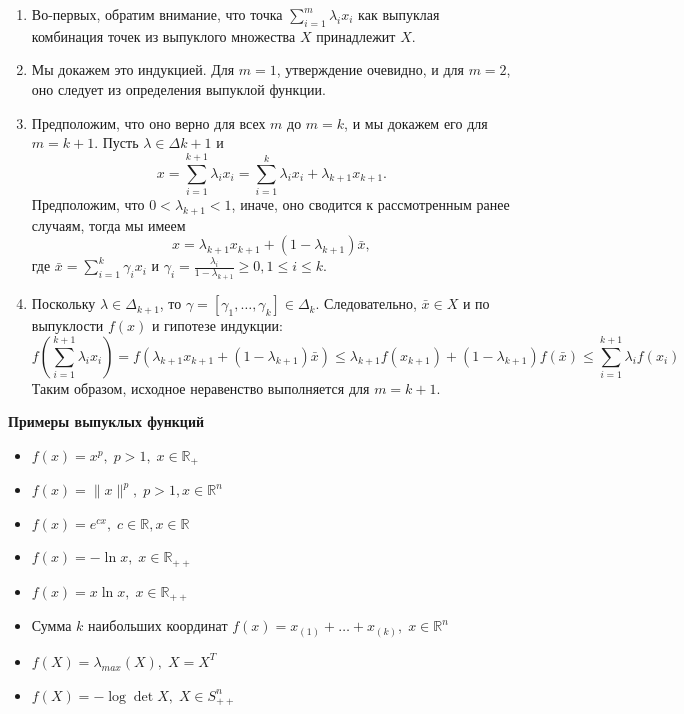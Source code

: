 \documentclass[
  russian,
  letterpaper,
  DIV=11,
  numbers=noendperiod]{scrartcl}
\providecommand{\tightlist}{%
  \setlength{\itemsep}{0pt}\setlength{\parskip}{0pt}}
\begin{document}
\begin{enumerate}
\def\labelenumi{\arabic{enumi}.}
\item
  Во-первых, обратим внимание, что точка
  \(\sum_{i=1}^{m} \lambda_i x_i\) как выпуклая комбинация точек из
  выпуклого множества \(X\) принадлежит \(X\).
\item
  Мы докажем это индукцией. Для \(m = 1\), утверждение очевидно, и для
  \(m = 2\), оно следует из определения выпуклой функции.
\item
  Предположим, что оно верно для всех \(m\) до \(m = k\), и мы докажем
  его для \(m = k + 1\). Пусть \(\lambda \in \Delta{k+1}\) и \[
  x = \sum_{i=1}^{k+1} \lambda_i x_i = \sum_{i=1}^{k} \lambda_i x_i + \lambda_{k+1} x_{k+1}.
  \] Предположим, что \(0 < \lambda_{k+1} < 1\), иначе, оно сводится к
  рассмотренным ранее случаям, тогда мы имеем \[
  x = \lambda_{k+1} x_{k+1} + (1 - \lambda_{k+1}) \bar{x}, 
  \] где \(\bar{x} = \sum_{i=1}^{k} \gamma_i x_i\) и
  \(\gamma_i = \frac{\lambda_i}{1-\lambda_{k+1}} \geq 0, 1 \leq i \leq k\).
\item
  Поскольку \(\lambda \in \Delta_{k+1}\), то
  \(\gamma = [\gamma_1, \ldots, \gamma_k] \in \Delta_k\). Следовательно,
  \(\bar{x} \in X\) и по выпуклости \(f(x)\) и гипотезе индукции: \[
  f\left( \sum_{i=1}^{k+1} \lambda_i x_i \right) = f\left( \lambda_{k+1} x_{k+1} + (1 - \lambda_{k+1})\bar{x} \right) \leq
  \lambda_{k+1}f(x_{k+1}) + (1 - \lambda_{k+1})f(\bar{x}) \leq \sum_{i=1}^{k+1} \lambda_i f(x_i)
  \] Таким образом, исходное неравенство выполняется для \(m = k + 1\).
\end{enumerate}

\textbf{Примеры выпуклых функций}

\begin{itemize}
\tightlist
\item
  \(f(x) = x^p, \;  p > 1,\;  x \in \mathbb{R}_+\)
\item
  \(f(x) = \|x\|^p,\;  p > 1, x \in \mathbb{R}^n\)
\item
  \(f(x) = e^{cx},\;  c \in \mathbb{R}, x \in \mathbb{R}\)
\item
  \(f(x) = -\ln x,\;  x \in \mathbb{R}_{++}\)
\item
  \(f(x) = x\ln x,\;  x \in \mathbb{R}_{++}\)
\item
  Сумма \(k\) наибольших координат
  \(f(x) = x_{(1)} + \ldots + x_{(k)},\; x \in \mathbb{R}^n\)
\item
  \(f(X) = \lambda_{max}(X),\;  X = X^T\)
\item
  \(f(X) = - \log \det X, \;  X \in S^n_{++}\)
\end{itemize}
\end{document}
